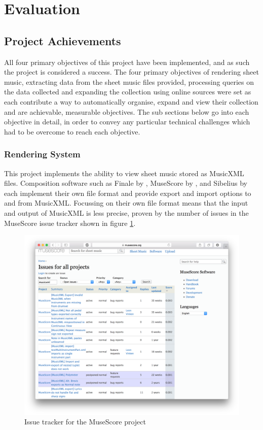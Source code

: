 \section{Evaluation}
\subsection{Project Achievements}
All four primary objectives of this project have been implemented, and as such the project is considered a success. The four primary objectives of rendering sheet music, extracting data from the sheet music files provided, processing queries on the data collected and expanding the collection using online sources were set as each contribute a way to automatically organise, expand and view their collection and are achievable, measurable objectives. The sub sections below go into each objective in detail, in order to convey any particular technical challenges which had to be overcome to reach each objective.
\subsubsection{Rendering System}
This project implements the ability to view sheet music stored as MusicXML files. Composition software such as Finale by \cite{finale}, MuseScore by \cite{MuseTour}, and Sibelius by \cite{avid} each implement their own file format and provide export and import options to and from MusicXML. Focussing on their own file format means that the input and output of MusicXML is less precise, proven by the number of issues in the MuseScore issue tracker shown in figure \ref{fig:issues}.

\begin{figure}[H]
\centering
\includegraphics[width=400pt]{issue_tracker}
\caption{Issue tracker for the MuseScore project}
\label{fig:issues}	
\end{figure}

